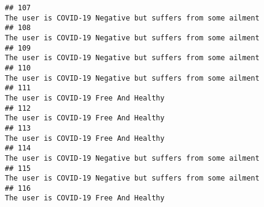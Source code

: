 \documentclass[
]{article}
\begin{document}
\begin{verbatim}
## 107                                                                                                                                                                                                        The user is COVID-19 Negative but suffers from some ailment
## 108                                                                                                                                                                                                        The user is COVID-19 Negative but suffers from some ailment
## 109                                                                                                                                                                                                        The user is COVID-19 Negative but suffers from some ailment
## 110                                                                                                                                                                                                        The user is COVID-19 Negative but suffers from some ailment
## 111                                                                                                                                                                                                                              The user is COVID-19 Free And Healthy
## 112                                                                                                                                                                                                                              The user is COVID-19 Free And Healthy
## 113                                                                                                                                                                                                                              The user is COVID-19 Free And Healthy
## 114                                                                                                                                                                                                        The user is COVID-19 Negative but suffers from some ailment
## 115                                                                                                                                                                                                        The user is COVID-19 Negative but suffers from some ailment
## 116                                                                                                                                                                                                                              The user is COVID-19 Free And Healthy

\end{verbatim}
\end{document}
